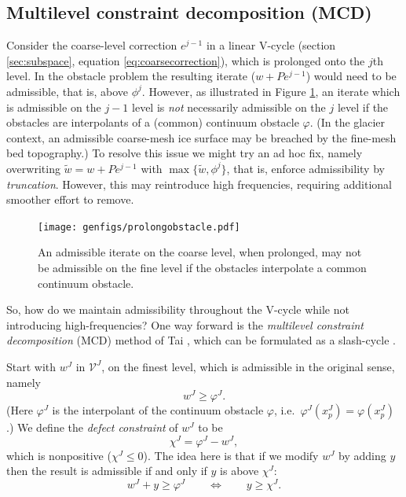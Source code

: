\documentclass[letterpaper,final,12pt,reqno]{amsart}
\theoremstyle{claim}
\numberwithin{equation}{section}
\numberwithin{figure}{section}
\numberwithin{table}{section}
\numberwithin{theorem}{section}
\begin{document}
\subsection*{Multilevel constraint decomposition (MCD)}  Consider the coarse-level correction $e^{j-1}$ in a linear V-cycle (section \ref{sec:subspace}, equation \eqref{eq:coarsecorrection}), which is prolonged onto the $j$th level.  In the obstacle problem the resulting iterate ($w+Pe^{j-1}$) would need to be admissible, that is, above $\phi^j$.  However, as illustrated in Figure \ref{fig:prolongobstacle}, an iterate which is admissible on the $j-1$ level is \emph{not} necessarily admissible on the $j$ level if the obstacles are interpolants of a (common) continuum obstacle $\varphi$.  (In the glacier context, an admissible coarse-mesh ice surface may be breached by the fine-mesh bed topography.)  To resolve this issue we might try an ad hoc fix, namely overwriting $\tilde w = w+Pe^{j-1}$ with $\max\{\tilde w,\phi^j\}$, that is, enforce admissibility by \emph{truncation}.  However, this may reintroduce high frequencies, requiring additional smoother effort to remove.

\begin{figure}
\qquad \texttt{[image: genfigs/prolongobstacle.pdf]}
\caption{An admissible iterate on the coarse level, when prolonged, may not be admissible on the fine level if the obstacles interpolate a common continuum obstacle.}
\label{fig:prolongobstacle}
\end{figure}

So, how do we maintain admissibility throughout the V-cycle while not introducing high-frequencies?  One way forward is the \emph{multilevel constraint decomposition} (MCD) method of Tai \cite{Tai2003}, which can be formulated as a slash-cycle \cite[Algorithm 4.7]{GraeserKornhuber2009}.

Start with $w^J$ in $\mathcal{V}^J$, on the finest level, which is admissible in the original sense, namely
\begin{equation}
  w^J \ge \varphi^J. \label{eq:fineadmissibleiterate}
\end{equation}
(Here $\varphi^J$ is the interpolant of the continuum obstacle $\varphi$, i.e.~$\varphi^J(x_p^J)=\varphi(x_p^J)$.)  We define the \emph{defect constraint} \cite{GraeserKornhuber2009} of $w^J$ to be
\begin{equation}
  \chi^J = \varphi^J - w^J,  \label{eq:defectconstraint}
\end{equation}
which is nonpositive ($\chi^J\le 0$).  The idea here is that if we modify $w^J$ by adding $y$ then the result is admissible if and only if $y$ is above $\chi^J$:
\begin{equation}
  w^J + y \ge \varphi^J  \qquad \iff \qquad y \ge \chi^J.  \label{eq:defectmeaning}
\end{equation}
\end{document}
